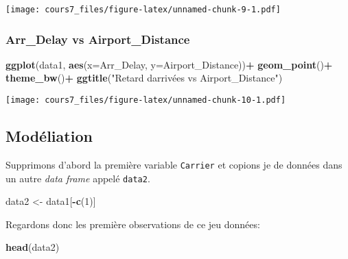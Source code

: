 \documentclass[
]{article}
\newenvironment{Shaded}{\begin{snugshade}}{\end{snugshade}}
\newcommand{\AttributeTok}[1]{\textcolor[rgb]{0.13,0.29,0.53}{#1}}
\newcommand{\DecValTok}[1]{\textcolor[rgb]{0.00,0.00,0.81}{#1}}
\newcommand{\FunctionTok}[1]{\textcolor[rgb]{0.13,0.29,0.53}{\textbf{#1}}}
\newcommand{\NormalTok}[1]{#1}
\newcommand{\OtherTok}[1]{\textcolor[rgb]{0.56,0.35,0.01}{#1}}
\newcommand{\SpecialCharTok}[1]{\textcolor[rgb]{0.81,0.36,0.00}{\textbf{#1}}}
\newcommand{\StringTok}[1]{\textcolor[rgb]{0.31,0.60,0.02}{#1}}
\begin{document}
\texttt{[image: cours7\_files/figure-latex/unnamed-chunk-9-1.pdf]}

\hypertarget{arr_delay-vs-airport_distance}{%
\subsubsection{Arr\_Delay vs
Airport\_Distance}\label{arr_delay-vs-airport_distance}}

\begin{Shaded}
\begin{Highlighting}[]
\FunctionTok{ggplot}\NormalTok{(data1, }\FunctionTok{aes}\NormalTok{(}\AttributeTok{x=}\NormalTok{Arr\_Delay, }\AttributeTok{y=}\NormalTok{Airport\_Distance))}\SpecialCharTok{+}
  \FunctionTok{geom\_point}\NormalTok{()}\SpecialCharTok{+}
  \FunctionTok{theme\_bw}\NormalTok{()}\SpecialCharTok{+}
  \FunctionTok{ggtitle}\NormalTok{(}\StringTok{"Retard d\textquotesingle{}arrivées vs Airport\_Distance"}\NormalTok{)}
\end{Highlighting}
\end{Shaded}

\texttt{[image: cours7\_files/figure-latex/unnamed-chunk-10-1.pdf]}

\hypertarget{moduxe9liation}{%
\subsection{Modéliation}\label{moduxe9liation}}

Supprimons d'abord la première variable \texttt{Carrier} et copions je
de données dans un autre \emph{data frame} appelé \texttt{data2}.

\begin{Shaded}
\begin{Highlighting}[]
\NormalTok{data2 }\OtherTok{\textless{}{-}}\NormalTok{ data1[}\SpecialCharTok{{-}}\FunctionTok{c}\NormalTok{(}\DecValTok{1}\NormalTok{)]}
\end{Highlighting}
\end{Shaded}

Regardons donc les première observations de ce jeu données:

\begin{Shaded}
\begin{Highlighting}[]
\FunctionTok{head}\NormalTok{(data2)}
\end{Highlighting}
\end{Shaded}
\end{document}
